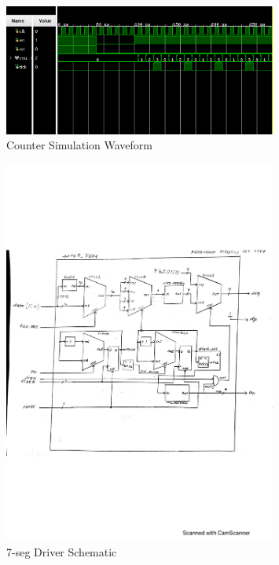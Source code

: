 \documentclass[11pt]{article}
\begin{document}
\begin{figure}[ht]\centering
	\includegraphics[width=0.8\textwidth,trim=0cm 0cm 0cm 0cm,clip]{counter_test_simwave(1)}
	\caption{Counter Simulation Waveform}
	\label{fig:counter_simwave}			
\end{figure}
\clearpage

\begin{figure}[ht]\centering
	\includegraphics[width=0.8\textwidth,trim=0.5cm 6.5cm 1cm 7.08cm,clip]{sseg4_TDM_schematic}
	\caption{7-seg Driver Schematic}
	\label{fig:sseg4_TDM_schematic}			
\end{figure}
\clearpage
\end{document}
